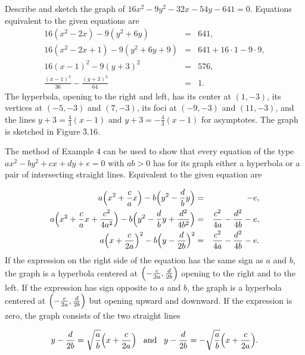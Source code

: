 \begin{example}
Describe and sketch the graph of $16x^2 - 9y^2 - 32x - 54y - 641 = 0$. Equations equivalent to the given equations are
\begin{eqnarray*}
                   16(x^2 - 2x) - 9(y^2 + 6y) &=& 641, \\
       16(x^2 - 2x + 1) - 9(y^2 + 6y + 9) &=& 641 + 16 \cdot 1 - 9 \cdot 9,\\
                      16(x - 1 )^2 - 9(y + 3)^2 &=& 576,\\
\frac{(x-1)^2}{36} - \frac{ (y+3)^2}{64} &=& 1.
\end{eqnarray*}
\noindent The hyperbola, opening to the right and left, has its center at $(1, - 3)$, its vertices at $(-5, -3)$ and $(7, -3)$, its foci at $(-9, -3)$ and $(11, -3)$, and the lines $y + 3 = \frac{4}{3}(x - 1)$ and $y + 3 = - \frac{4}{3}(x - 1)$ for asymptotes. The graph is sketched in Figure \f{3.16}.
\end{example}

The method of Example 4 can be used to show that every equation of the type $ax^2 - by^2 + cx + dy + e = 0$ with $ab > 0$ has for its graph either a hyperbola or a pair of intersecting straight lines. Equivalent to the given equation are

\begin{eqnarray*}
a \Bigl( x^2 + \frac{c}{a} x \Bigr) - b \Bigl( y^2 - \frac{d}{b} y \Bigr) &=& - e,\\
a \Bigl(x^2 + \frac{c}{a} x + \frac{c^2}{4a^2} \Bigr) - b \Bigl( y^2 - \frac{d}{b} y + \frac{d^2}{4b^2} \Bigr) &=&
\frac{c^2}{4a} - \frac{d^2}{4b} - e,\\ 
a \Bigl( x + \frac{c}{2a} \Bigr)^2 - b \Bigl( y - \frac{d}{2b} \Bigr)^2 &=& \frac{c^2}{4a} - \frac{d^2}{4b} - e. 
\end{eqnarray*}
\noindent If the expression on the right side of the equation has the
same sign as $a$ and $b$, the graph is a hyperbola centered at $\Bigl( -\frac{c}{2a}, \frac{d}{2b} \Bigr)$ opening to the right and to the left. If the expression has sign opposite to $a$ and $b$, the graph is a hyperbola centered at $\Bigl(-\frac{c}{2a}, \frac{d}{2b}\Bigr)$ but opening upward and downward. If the expression is zero, the graph consists of the two
straight lines

$$
y - \frac{d}{2b} = \sqrt{\frac{a}{b}} \Bigl(x + \frac{c}{2a} \Bigr) \;\;\; \mbox{and} \;\;\;
y - \frac{d}{2b} = - \sqrt{\frac{a}{b}} \Bigl(x + \frac{c}{2a} \Bigr).
$$

